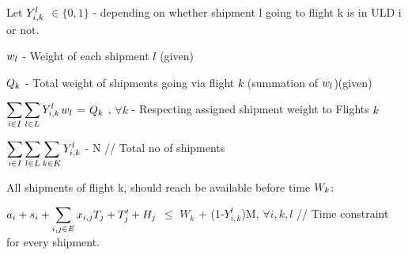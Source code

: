 \documentclass[english]{article}
\begin{document}
\begin{flushleft}
\pagebreak

Let $\textcolor{black}{Y_{i,k}^{l}}$ $\in\{0,1\}$ - depending on whether shipment l going to flight k is in ULD i or not.

$\textcolor{black}{w_{l}}$ - Weight of each shipment \textcolor{black}{$l$} (given)

$\textcolor{black}{Q_{k}}$ - Total weight of shipments going via flight \textcolor{black}{$k$} (summation of $\textcolor{black}{w_{l}}$)(given)

$\textcolor{black}{\displaystyle \sum_{i\in I} \sum_{l\in L}Y_{i,k}^{l}}$$\textcolor{black}{w_{l}}$ = $\textcolor{black}{Q_{k}}$ , $\forall{k}$ - Respecting assigned shipment weight to Flights \textcolor{black}{$k$}

$\textcolor{black}{\displaystyle \sum_{i\in I} \sum_{l\in L} \sum_{k\in K}Y_{i,k}^{l}}$ - N // Total no of shipments

All shipments of flight k, should reach be available before time $\textcolor{black}{W_{k}}$:

$\textcolor{black}{a_{i}+s_{i}+{\displaystyle \sum_{i,j\in E}x_{i,j}T_{j}}}+{T_{j}^{\prime}}+{H_{j}}$ $\leq$ ${W_{k}}$ + (1-${Y_{i,k}^{l}}$)M, $\forall{i,k,l}$ // Time constraint for every shipment.

\end{flushleft}
\end{document}
